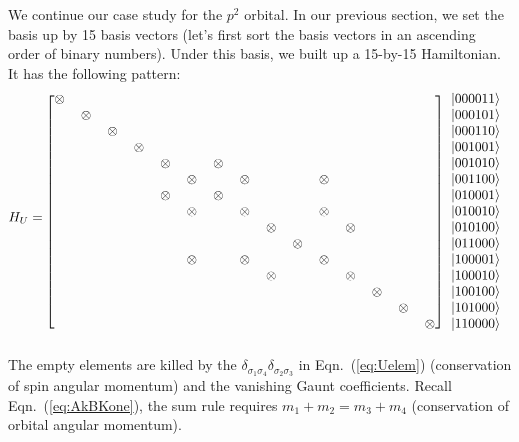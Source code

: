 We continue our case study for the $p^2$ orbital. In our previous section, we set
the basis up by 15 basis vectors (let's first sort the basis vectors
in an ascending order of binary numbers). Under this basis, we built up a 15-by-15
Hamiltonian. It has the following pattern:
\begin{equation*}
H_U =
\begin{blockarray}{cccccccccccccccc}
\begin{block}{[ccccccccccccccc]c}
\otimes &  &  &  &  &  &  &  &  &  &  &  &  &  &  & \Ket{000011} \\
 & \otimes &  &  &  &  &  &  &  &  &  &  &  &  &  & \Ket{000101} \\
 &  & \otimes &  &  &  &  &  &  &  &  &  &  &  &  & \Ket{000110} \\
 &  &  & \otimes &  &  &  &  &  &  &  &  &  &  &  & \Ket{001001} \\
 &  &  &  & \otimes &  & \otimes &  &  &  &  &  &  &  &  & \Ket{001010} \\
 &  &  &  &  & \otimes &  & \otimes &  &  & \otimes &  &  &  &  & \Ket{001100} \\
 &  &  &  & \otimes &  & \otimes &  &  &  &  &  &  &  &  & \Ket{010001} \\
 &  &  &  &  & \otimes &  & \otimes &  &  & \otimes &  &  &  &  & \Ket{010010} \\
 &  &  &  &  &  &  &  & \otimes &  &  & \otimes &  &  &  & \Ket{010100} \\
 &  &  &  &  &  &  &  &  & \otimes &  &  &  &  &  & \Ket{011000} \\
 &  &  &  &  & \otimes &  & \otimes &  &  & \otimes &  &  &  &  & \Ket{100001} \\
 &  &  &  &  &  &  &  & \otimes &  &  & \otimes &  &  &  & \Ket{100010} \\
 &  &  &  &  &  &  &  &  &  &  &  & \otimes &  &  & \Ket{100100} \\
 &  &  &  &  &  &  &  &  &  &  &  &  & \otimes &  & \Ket{101000} \\
 &  &  &  &  &  &  &  &  &  &  &  &  &  & \otimes & \Ket{110000} \\
\end{block}
\end{blockarray}
\end{equation*}
The empty elements are killed by the $\delta_{\sigma_1\sigma_4}\delta_{\sigma_2\sigma_3}$
in Eqn.~(\ref{eq:Uelem}) (conservation of spin angular momentum)
and the vanishing Gaunt coefficients. Recall Eqn.~(\ref{eq:AkBKone}),
the sum rule requires $m_1+m_2 = m_3+m_4$ (conservation of orbital angular momentum).
